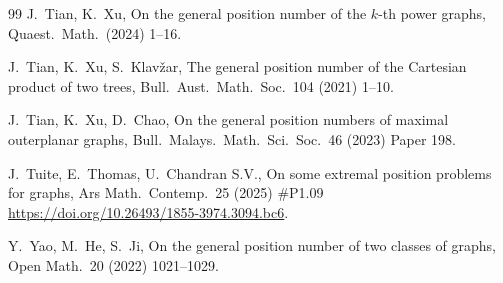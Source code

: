 \documentclass[12pt]{article}
\begin{document}
\begin{thebibliography}{99}
J.~Tian, K.~Xu, 
On the general position number of the $k$-th power graphs, Quaest.\ Math.\ (2024) 1--16.

J.~Tian, K.~Xu, S.~Klav\v{z}ar,
The general position number of the Cartesian product of two trees,
Bull.\ Aust.\ Math.\ Soc.\ 104 (2021) 1--10.

J.~Tian, K.~Xu, D.~Chao,
On the general position numbers of maximal outerplanar graphs,
Bull.\ Malays.\ Math.\ Sci.\ Soc.\ 46 (2023) Paper 198.

J.~Tuite, E.~Thomas, U.~Chandran S.V., 
On some extremal position problems for graphs, 
Ars Math.\ Contemp.\ 25 (2025) \#P1.09 \url{https://doi.org/10.26493/1855-3974.3094.bc6}. 

Y.~Yao, M.~He, S.~Ji,
On the general position number of two classes of graphs,
Open Math.\ 20 (2022) 1021--1029.

\end{thebibliography}
\end{document}
